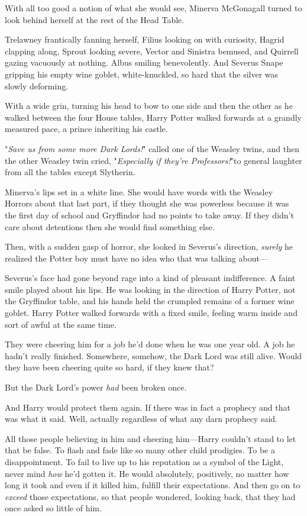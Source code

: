 With all too good a notion of what she would see, Minerva McGonagall turned to 
look behind herself at the rest of the Head Table.

Trelawney frantically fanning herself, Filius looking on with curiosity, Hagrid 
clapping along, Sprout looking severe, Vector and Sinistra bemused, and 
Quirrell gazing vacuously at nothing. Albus smiling benevolently. And Severus 
Snape gripping his empty wine goblet, white-knuckled, so hard that the silver 
was slowly deforming.

With a wide grin, turning his head to bow to one side and then the other as he 
walked between the four House tables, Harry Potter walked forwards at a grandly 
measured pace, a prince inheriting his castle.

"\emph{Save us from some more Dark Lords!}" called one of the Weasley twins, 
and then the other Weasley twin cried, "\emph{Especially if they're 
Professors!}"to general laughter from all the tables except Slytherin.

Minerva's lips set in a white line. She would have words with the Weasley 
Horrors about that last part, if they thought she was powerless because it was 
the first day of school and Gryffindor had no points to take away. If they 
didn't care about detentions then she would find something else.

Then, with a sudden gasp of horror, she looked in Severus's direction, 
\emph{surely} he realized the Potter boy must have no idea who that was talking 
about---

Severus's face had gone beyond rage into a kind of pleasant indifference. A 
faint smile played about his lips. He was looking in the direction of Harry 
Potter, not the Gryffindor table, and his hands held the crumpled remains of a 
former wine goblet.
\sbreak
Harry Potter walked forwards with a fixed smile, feeling warm inside and sort 
of awful at the same time.

They were cheering him for a job he'd done when he was one year old. A job he 
hadn't really finished. Somewhere, somehow, the Dark Lord was still alive. 
Would they have been cheering quite so hard, if they knew that?

But the Dark Lord's power \emph{had} been broken once.

And Harry would protect them again. If there was in fact a prophecy and that 
was what it said. Well, actually regardless of what any darn prophecy said.

All those people believing in him and cheering him---Harry couldn't stand to 
let that be false. To flash and fade like so many other child prodigies. To be 
a disappointment. To fail to live up to his reputation as a symbol of the 
Light, never mind \emph{how} he'd gotten it. He would absolutely, positively, 
no matter how long it took and even if it killed him, fulfill their 
expectations. And then go on to \emph{exceed} those expectations, so that 
people wondered, looking back, that they had once asked so little of him.

